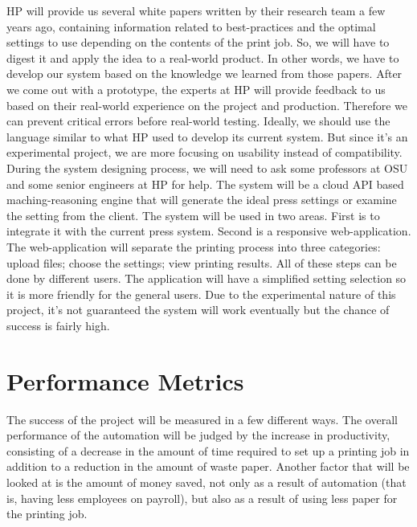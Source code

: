 \documentclass[draftclsnofoot,onecolumn,10pt]{IEEEtran}
\begin{document}
HP will provide us several white papers written by their research team a few years ago, containing information related to best-practices and the optimal settings to use depending on the contents of the print job. So, we will have to digest it and apply the idea to a real-world product. In other words, we have to develop our system based on the knowledge we learned from those papers. After we come out with a prototype, the experts at HP will provide feedback to us based on their real-world experience on the project and production. Therefore we can prevent critical errors before real-world testing. Ideally, we should use the language similar to what HP used to develop its current system. But since it’s an experimental project, we are more focusing on usability instead of compatibility.\\

During the system designing process, we will need to ask some professors at OSU and some senior engineers at HP for help. The system will be a cloud API based maching-reasoning engine that will generate the ideal press settings or examine the setting from the client. The system will be used in two areas. First is to integrate it with the current press system. Second is a responsive web-application. The web-application will separate the printing process into three categories: upload files; choose the settings; view printing results. All of these steps can be done by different users. The application will have a simplified setting selection so it is more friendly for the general users. Due to the experimental nature of this project, it’s not guaranteed the system will work eventually but the chance of success is fairly high.

\bigskip
\section{Performance Metrics}
The success of the project will be measured in a few different ways. The overall performance of the automation will be judged by the increase in productivity, consisting of a decrease in the amount of time required to set up a printing job in addition to a reduction in the amount of waste paper. Another factor that will be looked at is the amount of money saved, not only as a result of automation (that is, having less employees on payroll), but also as a result of using less paper for the printing job.
\end{document}
